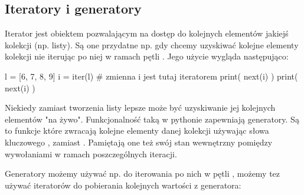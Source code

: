 % 
% 
% 
% 

\subsection{Iteratory i generatory \zaawansowane{**}}

Iterator jest obiektem pozwalającym na dostęp do kolejnych elementów jakiejś kolekcji (np. listy).
Są one przydatne np. gdy chcemy uzyskiwać kolejne elementy kolekcji nie iterując po niej w ramach pętli .
Jego użycie wygląda następująco:

\begin{CodeFrame*}[python]{}
l = [6, 7, 8, 9]
i = iter(l)  # zmienna i jest tutaj iteratorem
print( next(i) )
print( next(i) )
\end{CodeFrame*}

Niekiedy zamiast tworzenia listy lepsze może być uzyskiwanie jej kolejnych elementów "na żywo".
Funkcjonalność taką w pythonie zapewniają generatory.
Są to funkcje które zwracają kolejne elementy danej kolekcji używając słowa kluczowego , zamiast .
Pamiętają one też swój stan wewnętrzny pomiędzy wywołaniami w ramach poszczególnych iteracji.

Generatory możemy używać np. do iterowania po nich w pętli ,
możemy tez używać iteratorów do pobierania kolejnych wartości z generatora:

